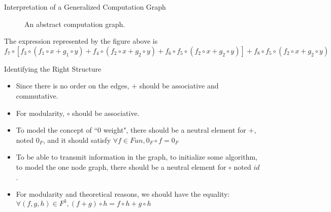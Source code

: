 \documentclass[11pt]{beamer}
\begin{document}
\begin{frame}{Interpretation of a Generalized Computation Graph}

\begin{figure}[!h]
	\centering
	\caption{An abstract computation graph.}
	\label{fig:graphe_calc_abstr}
\end{figure}
The expression represented by the figure above is $f_7 \circ [f_3 \circ (f_1 \circ x + g_1 \circ y) + f_4 \circ ( f_2 \circ x + g_2 \circ y) + f_6 \circ f_5 \circ (f_2 \circ x + g_2 \circ y) ] + f_8 \circ f_5 \circ (f_2 \circ x + g_2 \circ y)$

\end{frame}

\begin{frame}{Identifying the Right Structure}

	\begin{itemize}

		\item Since there is no order on the edges, $+$ should be associative and commutative.
		
		\item For modularity, $\circ$ should be associative.
		
		\item To model the concept of ``$0$ weight", there should be a neutral element for $+$, noted $0_F$, and it should satisfy $\forall f \in Fun, 0_F \circ f = 0_F$
		
		\item To be able to transmit information in the graph, to initialize some algorithm, to model the one node graph, there should be a neutral element for $\circ$ noted $id$. 
		
		\item For modularity and theoretical reasons, we should have the equality: $\forall (f,g,h) \in F^3, (f+g)\circ h = f \circ h + g \circ h$ 

	\end{itemize}

\end{frame}
\end{document}
